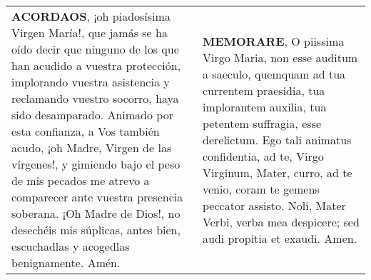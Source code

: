 \documentclass[./rosary.tex]{subfiles}
\begin{document}
\begin{longtable} { p{} p{} }
    \textbf{ACORDAOS}, ¡oh piadosísima Virgen María!, que jamás se ha oído decir que ninguno de los que han acudido a vuestra protección,
    implorando vuestra asistencia y reclamando vuestro socorro, haya sido desamparado. Animado por esta confianza, a Vos también acudo,
    ¡oh Madre, Virgen de las vírgenes!, y gimiendo bajo el peso de mis pecados me atrevo a comparecer ante vuestra presencia soberana.
    ¡Oh Madre de Dios!, no desechéis mis súplicas, antes bien, escuchadlas y acogedlas benignamente. Amén.

    &
    
    \textbf{MEMORARE}, O piissima Virgo Maria, non esse auditum a saeculo, quemquam ad tua currentem praesidia, tua implorantem auxilia, 
    tua petentem suffragia, esse derelictum. Ego tali animatus confidentia, ad te, Virgo Virginum, Mater, curro, ad te venio, coram te gemens 
    peccator assisto. Noli, Mater Verbi, verba mea despicere; sed audi propitia et exaudi. Amen. 
\end{longtable}
\end{document}

